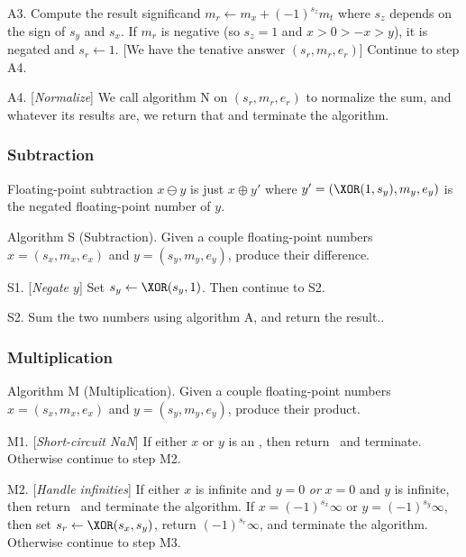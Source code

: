 \algstep A3. Compute the result significand $m_{r}\gets m_{x} + (-1)^{s_{z}}m_{t}$
where $s_{z}$ depends on the sign of $s_{y}$ and $s_{x}$. If $m_{r}$
is negative (so $s_{z}=1$ and $x>0>-x>y$), it is negated and $s_{r}\gets 1$.
[We have the tenative answer $(s_{r}, m_{r}, e_{r})$] Continue to step A4.

\algstep A4. [{\it Normalize\/}] We call algorithm N on $(s_{r}, m_{r}, e_{r})$
to normalize the sum, and whatever its results are, we return that and
terminate the algorithm.\quad\slug


\subsubsection{Subtraction}

\begin{rmk}[Subtraction]
  Floating-point subtraction $x\ominus y$ is just $x\oplus y'$ where
  $y' = (\XOR(1,s_{y}),m_{y},e_{y})$ is the negated floating-point
  number of $y$.
\end{rmk}

\algbegin Algorithm S (Subtraction). \label{alg:float-subtraction}Given a couple floating-point
numbers $x=(s_{x},m_{x},e_{x})$ and $y=(s_{y}, m_{y}, e_{y})$, produce
their difference.

\algstep S1. [{\it Negate $y$\/}] Set $s_{y}\gets\XOR(s_{y},1)$. Then
continue to S2.

\algstep S2. Sum the two numbers using algorithm A, and return the result.\quad\slug.

\subsubsection{Multiplication}


\algbegin Algorithm M (Multiplication). \label{alg:float-multiplication}Given a couple floating-point
numbers $x=(s_{x},m_{x},e_{x})$ and $y=(s_{y}, m_{y}, e_{y})$, produce
their product.

\algstep M1. [{\it Short-circuit NaN\/}] If either $x$ or $y$ is an
\NaN, then return \qNaN\ and terminate. Otherwise continue to step M2.

\algstep M2. [{\it Handle infinities\/}] If either $x$ is infinite and
$y=0$ \emph{or} $x=0$ and $y$ is infinite, then return \qNaN\ and
terminate the algorithm.
If $x=(-1)^{s_{x}}\infty$ or $y=(-1)^{s_{y}}\infty$, then set
$s_{r}\gets\XOR(s_{x},s_{y})$, return $(-1)^{s_{r}}\infty$, and
terminate the algorithm.
Otherwise continue to step M3.

